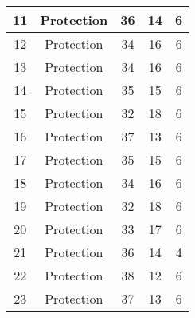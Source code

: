 \documentclass[results.tex]{subfiles}
\begin{document}
\begin{center}
\begin{tabular}{| c || c | c | c | c |}
            \hline
            11                      & Protection                   & 36                     & 14                      & 6                    \\
            \hline
            12                      & Protection                   & 34                     & 16                      & 6                    \\
            \hline
            13                      & Protection                   & 34                     & 16                      & 6                    \\
            \hline
            14                      & Protection                   & 35                     & 15                      & 6                    \\
            \hline
            15                      & Protection                   & 32                     & 18                      & 6                    \\
            \hline
            16                      & Protection                   & 37                     & 13                      & 6                    \\
            \hline
            17                      & Protection                   & 35                     & 15                      & 6                    \\
            \hline
            18                      & Protection                   & 34                     & 16                      & 6                    \\
            \hline
            19                      & Protection                   & 32                     & 18                      & 6                    \\
            \hline
            20                      & Protection                   & 33                     & 17                      & 6                    \\
            \hline
            21                      & Protection                   & 36                     & 14                      & 4                    \\
            \hline
            22                      & Protection                   & 38                     & 12                      & 6                    \\
            \hline
            23                      & Protection                   & 37                     & 13                      & 6                    \\

\end{tabular}
\end{center}
\end{document}
